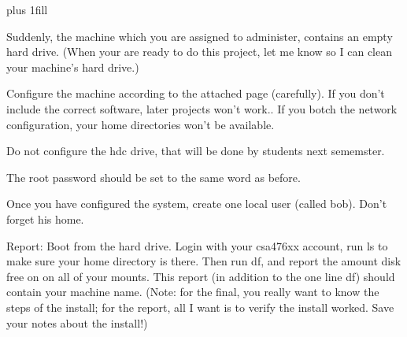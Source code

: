 
\rightskip=0pt plus 1fill

\parindent 0pt

Suddenly, the machine which you are assigned to administer,
contains an empty hard drive.
(When your are ready to do this project,
let me know so I can clean your machine's hard drive.)

Configure the machine according to the attached page (carefully).
If you don't include the correct software, later projects won't work..
If you botch the network configuration, your home directories won't
be available.

Do not configure the {\ltt{}hdc} drive,
that will be done by students next sememster.

The root password should be set to the same word as before.

Once you have configured the system, create one local user (called bob).
Don't forget his home.

Report: Boot from the hard drive.
Login with your csa476xx account, 
run {\ltt{}ls} to make sure your home directory is there.
Then run {\ltt{}df}, and report the amount disk free on 
on all of your mounts.
This report (in addition to the one line df) should contain your machine name.
(Note: for the final, you really want to know the steps of the install;
for the report, all I want is to verify the install worked.
Save your notes about the install!)

\bye
